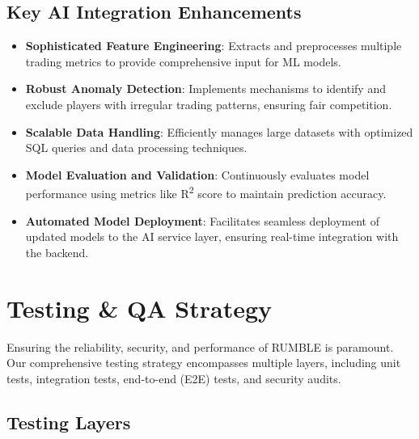 \documentclass[11pt,a4paper]{article}
\begin{document}
\subsection{Key AI Integration Enhancements}

\begin{itemize}
    \item \textbf{Sophisticated Feature Engineering}: Extracts and preprocesses multiple trading metrics to provide comprehensive input for ML models.
    \item \textbf{Robust Anomaly Detection}: Implements mechanisms to identify and exclude players with irregular trading patterns, ensuring fair competition.
    \item \textbf{Scalable Data Handling}: Efficiently manages large datasets with optimized SQL queries and data processing techniques.
    \item \textbf{Model Evaluation and Validation}: Continuously evaluates model performance using metrics like R\textsuperscript{2} score to maintain prediction accuracy.
    \item \textbf{Automated Model Deployment}: Facilitates seamless deployment of updated models to the AI service layer, ensuring real-time integration with the backend.
\end{itemize}

\section{Testing \& QA Strategy}

Ensuring the reliability, security, and performance of RUMBLE is paramount. Our comprehensive testing strategy encompasses multiple layers, including unit tests, integration tests, end-to-end (E2E) tests, and security audits.

\subsection{Testing Layers}
\end{document}
